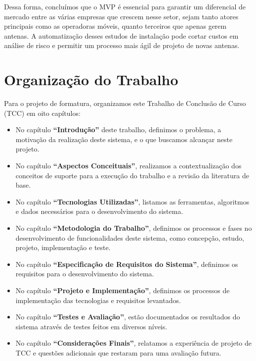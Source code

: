 \documentclass[]{politex}
\begin{document}
Dessa forma, concluímos que o MVP é essencial para garantir um diferencial de
mercado entre as várias empresas que crescem nesse setor, sejam tanto atores
principais como as operadoras móveis, quanto terceiros que apenas gerem antenas.
A automatização desses estudos de instalação pode cortar custos em análise de
risco e permitir um processo mais ágil de projeto de novas antenas.

\section{Organização do Trabalho}

Para o projeto de formatura, organizamos este Trabalho de Conclusão de Curso
(TCC) em oito capítulos:

\begin{itemize}

\item No capítulo \textbf{``Introdução''} deste trabalho, definimos o problema,
a motivação da realização deste sistema, e o que buscamos alcançar neste
projeto.

\item No capítulo \textbf{``Aspectos Conceituais''}, realizamos a
contextualização dos conceitos de suporte para a execução do trabalho e a
revisão da literatura de base.

\item No capítulo \textbf{``Tecnologias Utilizadas''}, listamos as ferramentas,
algoritmos e dados necessários para o desenvolvimento do sistema.

\item No capítulo \textbf{``Metodologia do Trabalho''}, definimos os processos e
fases no desenvolvimento de funcionalidades deste sistema, como concepção,
estudo, projeto, implementação e teste.

\item No capítulo \textbf{``Especificação de Requisitos do Sistema''}, definimos
os requisitos para o desenvolvimento do sistema.

\item No capítulo \textbf{``Projeto e Implementação''}, definimos os processos
de implementação das tecnologias e requisitos levantados.

\item No capítulo \textbf{``Testes e Avaliação''}, estão documentados os
resultados do sistema através de testes feitos em diversos níveis.

\item No capítulo \textbf{``Considerações Finais''}, relatamos a experiência de
projeto de TCC e questões adicionais que restaram para uma avaliação futura.

\end{itemize}
\end{document}
